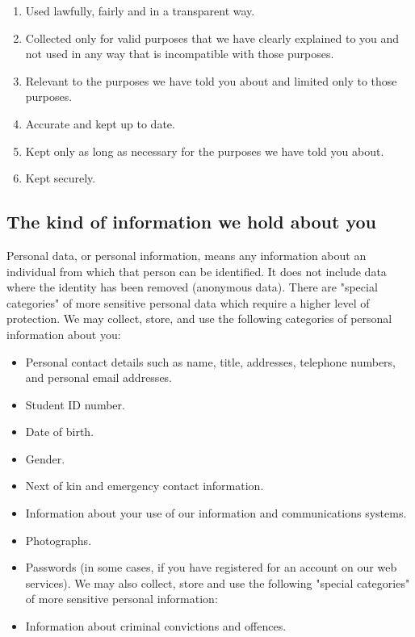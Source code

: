 \documentclass[12pt]{article}
\begin{document}
\begin{enumerate}
\item Used lawfully, fairly and in a transparent way.
\item Collected only for valid purposes that we have clearly explained to you and not used in any way that is incompatible with those purposes.
\item Relevant to the purposes we have told you about and limited only to those purposes.
\item Accurate and kept up to date.
\item Kept only as long as necessary for the purposes we have told you about.
\item Kept securely.
\end{enumerate}

\subsection{The kind of information we hold about you}
Personal data, or personal information, means any information about an individual from which that person can be identified. It does not include data where the identity has been removed (anonymous data).
There are "special categories" of more sensitive personal data which require a higher level of protection.
We may collect, store, and use the following categories of personal information about you:

\begin{itemize}
\item Personal contact details such as name, title, addresses, telephone numbers, and personal email addresses.
\item Student ID number.
\item Date of birth.
\item Gender.
\item Next of kin and emergency contact information.
\item Information about your use of our information and communications systems.
\item Photographs.
\item Passwords (in some cases, if you have registered for an account on our web services).
We may also collect, store and use the following "special categories" of more sensitive personal information:
\item Information about criminal convictions and offences.

\end{itemize}
\end{document}
